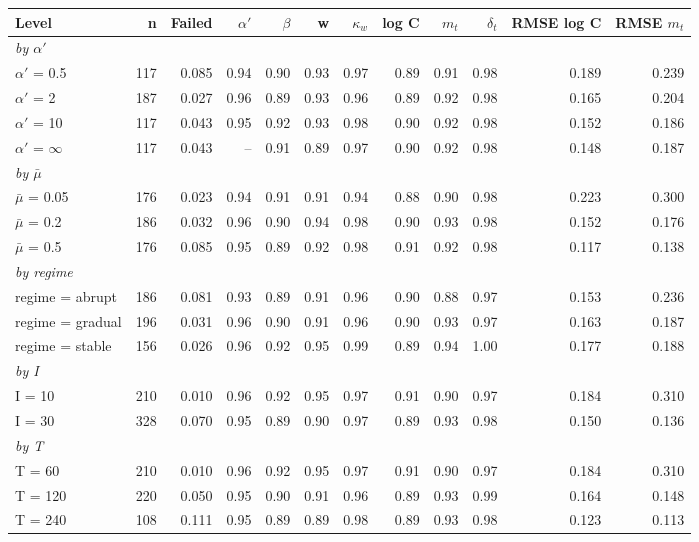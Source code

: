 \documentclass[10pt,a4paper]{article}
\begin{document}
\vspace{6pt}
\noindent\begin{minipage}{\linewidth}
\centering\scriptsize
\begin{tabular}{lrrrrrrrrrrr}
\toprule
Level & n & Failed & $\alpha'$ & $\beta$ & w & $\kappa_w$ & log C & $m_t$ & $\delta_t$ & RMSE log C & RMSE $m_t$ \\ \midrule
\multicolumn{12}{l}{\itshape by $\alpha'$} \\
$\alpha'$ = 0.5 & 117 & 0.085 & 0.94 & 0.90 & 0.93 & 0.97 & 0.89 & 0.91 & 0.98 & 0.189 & 0.239 \\
$\alpha'$ = 2 & 187 & 0.027 & 0.96 & 0.89 & 0.93 & 0.96 & 0.89 & 0.92 & 0.98 & 0.165 & 0.204 \\
$\alpha'$ = 10 & 117 & 0.043 & 0.95 & 0.92 & 0.93 & 0.98 & 0.90 & 0.92 & 0.98 & 0.152 & 0.186 \\
$\alpha'$ = $\infty$ & 117 & 0.043 & – & 0.91 & 0.89 & 0.97 & 0.90 & 0.92 & 0.98 & 0.148 & 0.187 \\
\multicolumn{12}{l}{\itshape by $\bar{\mu}$} \\
$\bar{\mu}$ = 0.05 & 176 & 0.023 & 0.94 & 0.91 & 0.91 & 0.94 & 0.88 & 0.90 & 0.98 & 0.223 & 0.300 \\
$\bar{\mu}$ = 0.2 & 186 & 0.032 & 0.96 & 0.90 & 0.94 & 0.98 & 0.90 & 0.93 & 0.98 & 0.152 & 0.176 \\
$\bar{\mu}$ = 0.5 & 176 & 0.085 & 0.95 & 0.89 & 0.92 & 0.98 & 0.91 & 0.92 & 0.98 & 0.117 & 0.138 \\
\multicolumn{12}{l}{\itshape by regime} \\
regime = abrupt & 186 & 0.081 & 0.93 & 0.89 & 0.91 & 0.96 & 0.90 & 0.88 & 0.97 & 0.153 & 0.236 \\
regime = gradual & 196 & 0.031 & 0.96 & 0.90 & 0.91 & 0.96 & 0.90 & 0.93 & 0.97 & 0.163 & 0.187 \\
regime = stable & 156 & 0.026 & 0.96 & 0.92 & 0.95 & 0.99 & 0.89 & 0.94 & 1.00 & 0.177 & 0.188 \\
\multicolumn{12}{l}{\itshape by I} \\
I = 10 & 210 & 0.010 & 0.96 & 0.92 & 0.95 & 0.97 & 0.91 & 0.90 & 0.97 & 0.184 & 0.310 \\
I = 30 & 328 & 0.070 & 0.95 & 0.89 & 0.90 & 0.97 & 0.89 & 0.93 & 0.98 & 0.150 & 0.136 \\
\multicolumn{12}{l}{\itshape by T} \\
T = 60 & 210 & 0.010 & 0.96 & 0.92 & 0.95 & 0.97 & 0.91 & 0.90 & 0.97 & 0.184 & 0.310 \\
T = 120 & 220 & 0.050 & 0.95 & 0.90 & 0.91 & 0.96 & 0.89 & 0.93 & 0.99 & 0.164 & 0.148 \\
T = 240 & 108 & 0.111 & 0.95 & 0.89 & 0.89 & 0.98 & 0.89 & 0.93 & 0.98 & 0.123 & 0.113 \\
\bottomrule
\end{tabular}
\end{minipage}
\vspace{8pt}
\end{document}
